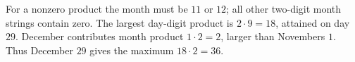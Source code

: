 For a nonzero product the month must be $11$ or $12$; all other two-digit month strings contain zero. The largest day-digit product is $2\cdot9=18$, attained on day $29$. December contributes month product $1\cdot2=2$, larger than November\textquotesingle s $1$. Thus December $29$ gives the maximum $18\cdot2=\boxed{36}$.
